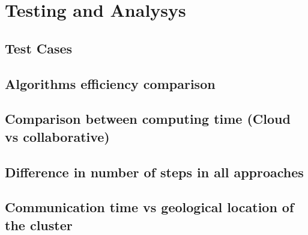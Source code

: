\chapter{Testing and Analysys}

\section{Test Cases}


\section{Algorithms efficiency comparison}


\section{Comparison between computing time (Cloud vs collaborative)}


\section{Difference in number of steps in all approaches}


\section{Communication time vs geological location of the cluster}
